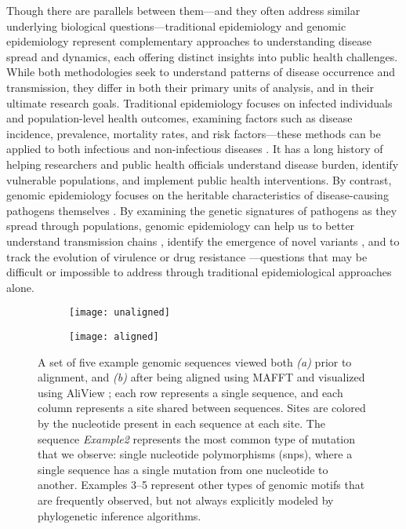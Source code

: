 Though there are parallels between them---and they often address similar underlying biological questions---traditional epidemiology and genomic epidemiology represent complementary approaches to understanding disease spread and dynamics, each offering distinct insights into public health challenges.
While both methodologies seek to understand patterns of disease occurrence and transmission, they differ in both their primary units of analysis, and in their ultimate research goals.
Traditional epidemiology focuses on infected individuals and population-level health outcomes, examining factors such as disease incidence, prevalence, mortality rates, and risk factors---these methods can be applied to both infectious and non-infectious diseases \citep{stamler1973epidemiology,cameron2019basal}.
It has a long history of helping researchers and public health officials understand disease burden, identify vulnerable populations, and implement public health interventions.
By contrast, genomic epidemiology focuses on the heritable characteristics of disease-causing pathogens themselves \citep{armstrong2019pathogen}.
By examining the genetic signatures of pathogens as they spread through populations, genomic epidemiology can help us to better understand transmission chains \citep{xu2020transmission}, identify the emergence of novel variants \citep{dudas2021emergence}, and to track the evolution of virulence or drug resistance \citep{stanczak2015within}---questions that may be difficult or impossible to address through traditional epidemiological approaches alone.

\begin{figure}[ht]
  \centering
  \begin{subfigure}{0.95\textwidth}
    \texttt{[image: unaligned]}
    \caption{}
  \end{subfigure}
  \begin{subfigure}{0.95\textwidth}
    \texttt{[image: aligned]}
    \caption{}
  \end{subfigure}
  \caption[Multiple sequence alignment]{A set of five example genomic sequences viewed both \textit{(a)} prior to alignment, and \textit{(b)} after being aligned using MAFFT \citep{katoh2013mafft} and visualized using AliView \citep{larsson2014aliview}; each row represents a single sequence, and each column represents a site shared between sequences. Sites are colored by the nucleotide present in each sequence at each site. The sequence \textit{Example2} represents the most common type of mutation that we observe: single nucleotide polymorphisms (\gls{snp}s), where a single sequence has a single mutation from one nucleotide to another. Examples 3--5 represent other types of genomic motifs that are frequently observed, but not always explicitly modeled by phylogenetic inference algorithms.}
  \label{fig:alignment}
\end{figure}

